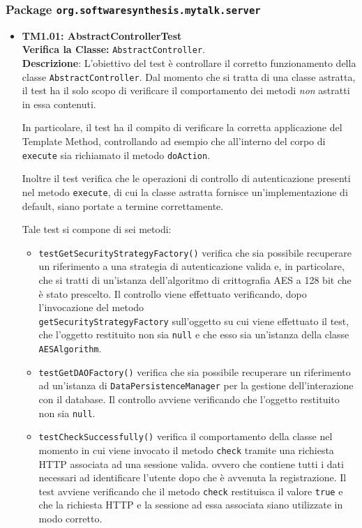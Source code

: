 \subsubsection{Package \texttt{org.softwaresynthesis.mytalk.server}}
\begin{itemize}

\item[\passed] \textbf{TM1.01: AbstractControllerTest}\\
\textbf{Verifica la Classe:} \texttt{AbstractController}.\\
\textbf{Descrizione}: L'obiettivo del test è controllare il corretto funzionamento della classe \texttt{AbstractController}. Dal momento che si tratta di una classe astratta, il test ha il solo scopo di verificare il comportamento dei metodi \textit{non} astratti in essa contenuti.

In particolare, il test ha il compito di verificare la corretta applicazione del  Template Method, controllando ad esempio che all'interno del corpo di \texttt{execute} sia richiamato il metodo \texttt{doAction}.

Inoltre il test verifica che le operazioni di controllo di autenticazione presenti nel metodo \texttt{execute}, di cui la classe astratta fornisce un'implementazione di default, siano portate a termine correttamente.
 
Tale test si compone di sei metodi:
 \begin{itemize}
 
\item \texttt{testGetSecurityStrategyFactory()} verifica che sia possibile recuperare un riferimento a una strategia di autenticazione valida e, in particolare, che si tratti di un'istanza dell'algoritmo di crittografia AES a 128 bit che è stato prescelto. Il controllo viene effettuato verificando, dopo l'invocazione del metodo \\ \texttt{getSecurityStrategyFactory} sull'oggetto su cui viene effettuato il test, che l'oggetto restituito non sia \texttt{null} e che esso sia un'istanza della classe \texttt{AESAlgorithm}.

\item \texttt{testGetDAOFactory()} verifica che sia possibile recuperare un riferimento ad un'istanza di \texttt{DataPersistenceManager} per la gestione dell'interazione con il database. Il controllo avviene verificando che l'oggetto restituito non sia \texttt{null}.

\item \texttt{testCheckSuccessfully()} verifica il comportamento della classe nel momento in cui viene invocato il metodo \texttt{check} tramite una richiesta HTTP associata ad una sessione valida. ovvero che contiene tutti i dati necessari ad identificare l'utente dopo che è avvenuta la registrazione. Il test avviene verificando che il metodo \texttt{check} restituisca il valore \texttt{true} e che la richiesta HTTP e la sessione ad essa associata siano utilizzate in modo corretto.


\end{itemize}
\end{itemize}
